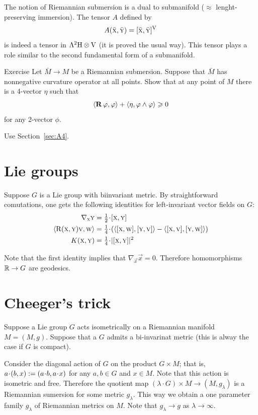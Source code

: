 The notion of Riemannian submersion is a dual to submanifold ($\approx$ lenght-preserving immersion).
The tensor $A$ defined by
\[A(\bar{\textsc x},\bar{ \textsc y})=[\bar{\textsc x},\bar{ \textsc y}]^{\operatorname{\rm V}}\]
is indeed a tensor in $\Lambda^2{\operatorname{\rm H}}\otimes{\operatorname{\rm V}}$ (it is proved the usual way).
This tensor plays a role similar to the second fundamental form of a submanifold.


\begin{thm}{Exercise}\label{ex:4-form}
Let $\bar M\to M$ be a Riemannian submersion.
Suppose that $\bar M$ has nonnegative curvature operator at all points.
Show that at any point of $M$ there is a 4-vector $\eta$  such that 
\[\langle\operatorname{\bf R}\nolimits \varphi,\varphi\rangle+\langle\eta,\varphi\wedge\varphi\rangle\geqslant 0\]
for any 2-vector $\phi$.
\end{thm}

 Use Section~\ref{sec:A4}.

\section{Lie groups}

Suppose $G$ is a Lie group with biinvariant metric.
By straightforward comutations, one gets the following identities for left-invariant vector fields on $G$:
\begin{align*}
\nabla_{\vec x}\vec y&=\tfrac12\cdot[\vec x,\vec y]
\\
\langle\Rm(\vec x,\vec y)\vec v,\vec w\rangle&=\tfrac14\cdot(\langle [\vec x,\vec w],[\vec y,\vec v]\rangle-\langle[\vec x,\vec v],[\vec y,\vec w]\rangle)
\\
K(\vec x,\vec y)&=\tfrac14\cdot|[\vec x,\vec y]|^2
\end{align*}

Note that the first identity implies that $\nabla_{\vec x}\vec x=0$.
Therefore homomorphisms $\mathbb{R}\to G$ are geodesics.


\section{Cheeger's trick}

Suppose a Lie group $G$ acts isometrically on a Riemannian manifold $M=(M,g)$.
Suppose that a $G$ admits a bi-invarinat metric (this is alway the case if $G$ is compact).

Consider the diagonal action of $G$ on the product $G\times M$;
that is, $a\cdot (b,x)\df(a\cdot b, a\cdot x)$ for any $a,b\in G$ and $x\in M$.
Note that this action is isometric and free.
Therefore the quotient map $(\lambda\cdot G)\times M\to (M,g_\lambda)$ is a Riemannian sumersion for some metric $g_\lambda$.
This way we obtain a one parameter family $g_\lambda$ of Riemannian metrics on $M$.
Note that $g_\lambda\to g$ as $\lambda\to \infty$.

